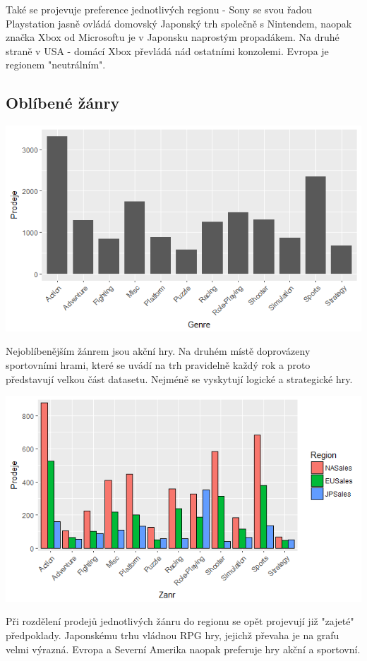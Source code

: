 \documentclass[a4paper,11pt]{article}
\begin{document}
Také se projevuje preference jednotlivých regionu - Sony se svou řadou Playstation jasně ovládá domovský Japonský trh společně s Nintendem, naopak značka Xbox od Microsoftu je v Japonsku naprostým propadákem. Na druhé straně v USA - domácí Xbox převládá nád ostatními konzolemi. Evropa je regionem "neutrálním".

\newpage

\subsection{Oblíbené žánry}


\includegraphics[scale=0.75]{Rplot04}

Nejoblíbenějším žánrem jsou akční hry. Na druhém místě doprovázeny sportovními hrami, které se uvádí na trh pravidelně každý rok a proto představují velkou část datasetu. Nejméně se vyskytují logické a strategické hry.

\includegraphics[scale=0.9]{Rplot06}

Při rozdělení prodejů jednotlivých žánru do regionu se opět projevují již "zajeté" předpoklady. Japonskému trhu vládnou RPG hry, jejichž převaha je na grafu velmi výrazná. Evropa a Severní Amerika naopak preferuje hry akční a sportovní.
\end{document}
